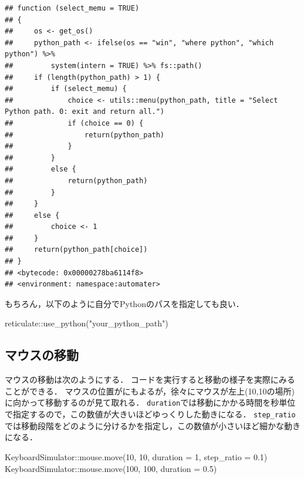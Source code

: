 \documentclass[
]{article}
\newenvironment{Shaded}{\begin{snugshade}}{\end{snugshade}}
\newcommand{\AttributeTok}[1]{\textcolor[rgb]{0.77,0.63,0.00}{#1}}
\newcommand{\DecValTok}[1]{\textcolor[rgb]{0.00,0.00,0.81}{#1}}
\newcommand{\FloatTok}[1]{\textcolor[rgb]{0.00,0.00,0.81}{#1}}
\newcommand{\FunctionTok}[1]{\textcolor[rgb]{0.00,0.00,0.00}{#1}}
\newcommand{\NormalTok}[1]{#1}
\newcommand{\SpecialCharTok}[1]{\textcolor[rgb]{0.00,0.00,0.00}{#1}}
\newcommand{\StringTok}[1]{\textcolor[rgb]{0.31,0.60,0.02}{#1}}
\begin{document}
\begin{verbatim}
## function (select_memu = TRUE) 
## {
##     os <- get_os()
##     python_path <- ifelse(os == "win", "where python", "which python") %>% 
##         system(intern = TRUE) %>% fs::path()
##     if (length(python_path) > 1) {
##         if (select_memu) {
##             choice <- utils::menu(python_path, title = "Select Python path. 0: exit and return all.")
##             if (choice == 0) {
##                 return(python_path)
##             }
##         }
##         else {
##             return(python_path)
##         }
##     }
##     else {
##         choice <- 1
##     }
##     return(python_path[choice])
## }
## <bytecode: 0x00000278ba6114f8>
## <environment: namespace:automater>
\end{verbatim}

もちろん，以下のように自分でPythonのパスを指定しても良い．

\begin{Shaded}
\begin{Highlighting}[]
\NormalTok{reticulate}\SpecialCharTok{::}\FunctionTok{use\_python}\NormalTok{(}\StringTok{"your\_python\_path"}\NormalTok{)}
\end{Highlighting}
\end{Shaded}

\hypertarget{ux30deux30a6ux30b9ux306eux79fbux52d5}{%
\subsection{マウスの移動}\label{ux30deux30a6ux30b9ux306eux79fbux52d5}}

マウスの移動は次のようにする．
コードを実行すると移動の様子を実際にみることができる．
マウスの位置がにもよるが，徐々にマウスが左上(10,10の場所)に向かって移動するのが見て取れる．
\texttt{duration}では移動にかかる時間を秒単位で指定するので，この数値が大きいほどゆっくりした動きになる．
\texttt{step\_ratio}では移動段階をどのように分けるかを指定し，この数値が小さいほど細かな動きになる．

\begin{Shaded}
\begin{Highlighting}[]
\NormalTok{KeyboardSimulator}\SpecialCharTok{::}\FunctionTok{mouse.move}\NormalTok{(}\DecValTok{10}\NormalTok{, }\DecValTok{10}\NormalTok{, }\AttributeTok{duration =} \DecValTok{1}\NormalTok{, }\AttributeTok{step\_ratio =} \FloatTok{0.1}\NormalTok{)}
\NormalTok{KeyboardSimulator}\SpecialCharTok{::}\FunctionTok{mouse.move}\NormalTok{(}\DecValTok{100}\NormalTok{, }\DecValTok{100}\NormalTok{, }\AttributeTok{duration =} \FloatTok{0.5}\NormalTok{)}
\end{Highlighting}
\end{Shaded}
\end{document}
